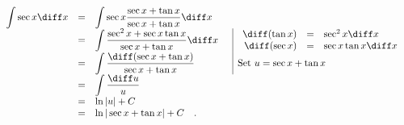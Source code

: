 {$\begin{array}{rcll|l}
\displaystyle \int \sec x \diff x&=&\displaystyle \int \sec x \frac{\sec x +\tan x }{\sec x+\tan x }\diff x  \\
&=& \displaystyle \int \frac{\sec^2 x+\sec x\tan x }{\sec x +\tan x }\diff x&&
\begin{array}{rcl}
\diff (\tan x )&=&\sec^2 x\diff x\\
\diff (\sec x)&=&\sec x\tan x \diff x
\end{array}\\
&=&\displaystyle  \int \frac{\diff (\sec x+\tan x) }{\sec x +\tan x} &&\text{Set }u=\sec x +\tan x\\
&=&\displaystyle \int \frac{\diff u}{u}\\
&=&\displaystyle \ln |u|+C\\
&=&\displaystyle \ln |\sec x +\tan x|+C\quad .
\end{array}
$
}


